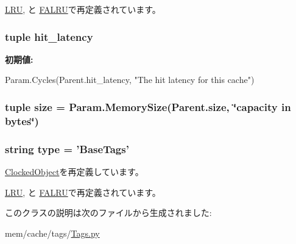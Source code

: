\hyperlink{classTags_1_1LRU_a17da7064bc5c518791f0c891eff05fda}{LRU}, と \hyperlink{classTags_1_1FALRU_a17da7064bc5c518791f0c891eff05fda}{FALRU}で再定義されています。\hypertarget{classTags_1_1BaseTags_a436a0fbcd55f5b33c39cb0e4b6898d0e}{
\subsubsection[{hit\_\-latency}]{\setlength{\rightskip}{0pt plus 5cm}tuple {\bf hit\_\-latency}}}
\label{classTags_1_1BaseTags_a436a0fbcd55f5b33c39cb0e4b6898d0e}
{\bfseries 初期値:}
\begin{DoxyCode}
Param.Cycles(Parent.hit_latency,
                               "The hit latency for this cache")
\end{DoxyCode}
\hypertarget{classTags_1_1BaseTags_a377e5da8df1f89c5468c8b8cd07eac89}{
\subsubsection[{size}]{\setlength{\rightskip}{0pt plus 5cm}tuple {\bf size} = Param.MemorySize(Parent.size, \char`\"{}capacity in bytes\char`\"{})}}
\label{classTags_1_1BaseTags_a377e5da8df1f89c5468c8b8cd07eac89}
\hypertarget{classTags_1_1BaseTags_acce15679d830831b0bbe8ebc2a60b2ca}{
\subsubsection[{type}]{\setlength{\rightskip}{0pt plus 5cm}string {\bf type} = '{\bf BaseTags}'}}
\label{classTags_1_1BaseTags_acce15679d830831b0bbe8ebc2a60b2ca}


\hyperlink{classClockedObject_1_1ClockedObject_acce15679d830831b0bbe8ebc2a60b2ca}{ClockedObject}を再定義しています。

\hyperlink{classTags_1_1LRU_acce15679d830831b0bbe8ebc2a60b2ca}{LRU}, と \hyperlink{classTags_1_1FALRU_acce15679d830831b0bbe8ebc2a60b2ca}{FALRU}で再定義されています。

このクラスの説明は次のファイルから生成されました:\begin{DoxyCompactItemize}
\item 
mem/cache/tags/\hyperlink{Tags_8py}{Tags.py}\end{DoxyCompactItemize}
